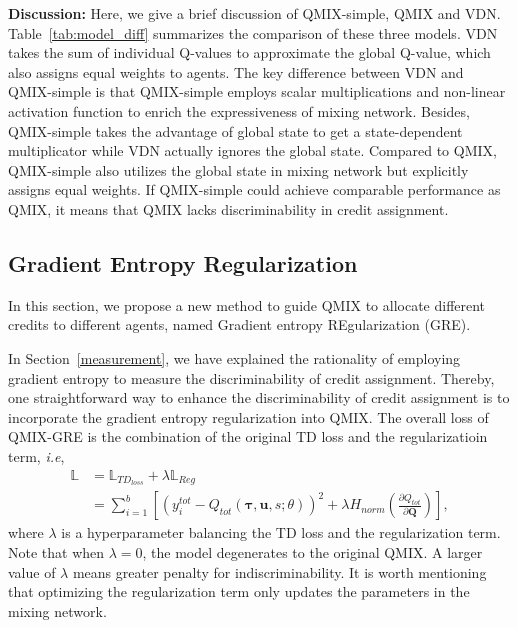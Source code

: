 \textbf{Discussion:} 
Here, we give a brief discussion of QMIX-simple, QMIX and VDN.
Table~\ref{tab:model_diff} summarizes the comparison of these three models.
VDN takes the sum of individual Q-values to approximate the global Q-value, which also assigns equal weights to agents.
The key difference between VDN and QMIX-simple is that QMIX-simple employs scalar multiplications and non-linear activation function to enrich the expressiveness of mixing network.
Besides, QMIX-simple takes the advantage of global state to get a state-dependent multiplicator while VDN actually ignores the global state.
Compared to QMIX, QMIX-simple also utilizes the global state in mixing network but explicitly assigns equal weights.
If QMIX-simple could achieve comparable performance as QMIX, it means that QMIX lacks discriminability in credit assignment.


\subsection{Gradient Entropy Regularization}
In this section, we propose a new method to guide QMIX to allocate different credits to different agents, named Gradient entropy REgularization (GRE).

In Section~\ref{measurement}, we have explained the rationality of employing gradient entropy to measure the discriminability of credit assignment.
Thereby, one straightforward way to enhance the discriminability of credit assignment is to incorporate the gradient entropy regularization into QMIX.
The overall loss of QMIX-GRE is the combination of the original TD loss and the regularizatioin term, \emph{i.e},
\begin{equation}
    \begin{aligned}
    \mathbb{L}&=\mathbb{L}_{TD_{loss}} + \lambda\mathbb{L}_{Reg}\\%
    &=\sum_{i=1}^b[(y_i^{tot}-Q_{tot}(\pmb{\tau},\pmb{u},s;\theta))^2+ \lambda H_{norm}(\frac{\partial Q_{tot}}{\partial \pmb{Q}})],
    \end{aligned}
    \label{reg}
\end{equation}
where $\lambda$ is a hyperparameter balancing the TD loss and the regularization term.
Note that when $\lambda = 0$, the model degenerates to the original QMIX.
A larger value of $\lambda$ means greater penalty for indiscriminability.
It is worth mentioning that optimizing the regularization term only updates the parameters in the mixing network.

